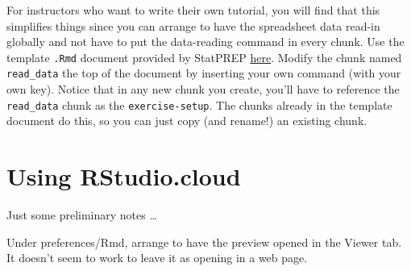 \documentclass[]{book}
\theoremstyle{definition}
\theoremstyle{definition}
\theoremstyle{definition}
\theoremstyle{remark}
\begin{document}
For instructors who want to write their own tutorial, you will find that
this simplifies things since you can arrange to have the spreadsheet
data read-in globally and not have to put the data-reading command in
every chunk. Use the template \texttt{.Rmd} document provided by
StatPREP \href{}{here}. Modify the chunk named \texttt{read\_data} the
top of the document by inserting your own command (with your own key).
Notice that in any new chunk you create, you'll have to reference the
\texttt{read\_data} chunk as the \texttt{exercise-setup}. The chunks
already in the template document do this, so you can just copy (and
rename!) an existing chunk.

\chapter{Using RStudio.cloud}\label{using-rstudio.cloud}

Just some preliminary notes \ldots{}

Under preferences/Rmd, arrange to have the preview opened in the Viewer
tab. It doesn't seem to work to leave it as opening in a web page.


\end{document}

